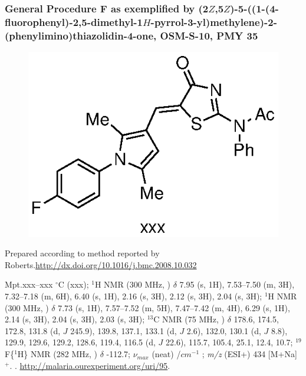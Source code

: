 \documentclass[12pt, a4paper,titlepage]{article}
\begin{document}
\subsubsection*{General Procedure F as exemplified by (2$Z$,5$Z$)-5-((1-(4-fluorophenyl)-2,5-dimethyl-1$H$-pyrrol-3-yl)methylene)-2-(phenylimino)thiazolidin-4-one, OSM-S-10, PMY 35}
 \label{exp:PMY35}
	\begin{figure}[H]
	\begin{center}
	\includegraphics{exp/PMY35.eps}
	\end{center}
	\vspace{-25pt}	
	\end{figure}	

Prepared according to method reported by Roberts.\url{http://dx.doi.org/10.1016/j.bmc.2008.10.032}


Mpt.xxx--xxx $^\circ$C (xxx); 
$^1$H NMR (300 MHz, ) $\delta$ 7.95 (s, 1H), 7.53--7.50 (m, 3H), 7.32--7.18 (m, 6H), 6.40 (s, 1H), 2.16 (s, 3H), 2.12 (s, 3H), 2.04 (s, 3H); 
$^1$H NMR (300 MHz, ) $\delta$ 7.73 (s, 1H), 7.57--7.52 (m, 5H), 7.47--7.42 (m, 4H), 6.29 (s, 1H), 2.14 (s, 3H), 2.04 (s, 3H), 2.03 (s, 3H);
 $^{13}$C NMR (75 MHz, ) $\delta$ 178.6, 174.5, 172.8, 131.8 (d, $J$ 245.9), 139.8, 137.1, 133.1 (d, $J$ 2.6), 132.0, 130.1 (d, $J$ 8.8), 129.9, 129.6, 129.2, 128.6, 119.4, 116.5 (d, $J$ 22.6), 115.7, 105.4, 25.1, 12.4, 10.7; 
$^{19}$F\{$^1$H\} NMR (282 MHz, ) $\delta$ -112.7;
 $\nu_{max}$ (neat) /$cm^{-1}$ ; 
\emph{m/z} (ESI+) 434 [M+Na]$^+$.
. 
\url{http://malaria.ourexperiment.org/uri/95}. 
\end{document}
